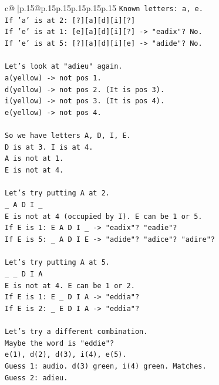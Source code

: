 \documentclass{article}
\begin{document}
{\begin{supertabular}{c@{$\;$}|p{.15\linewidth}@{}p{.15\linewidth}p{.15\linewidth}p{.15\linewidth}p{.15\linewidth}p{.15\linewidth}}
{{{\texttt{Known letters: a, e.} \\
\texttt{If 'a' is at 2: {[}?{]}{[}a{]}{[}d{]}{[}i{]}{[}?{]}} \\
\texttt{If 'e' is at 1: {[}e{]}{[}a{]}{[}d{]}{[}i{]}{[}?{]} {-}> "eadix"? No.} \\
\texttt{If 'e' is at 5: {[}?{]}{[}a{]}{[}d{]}{[}i{]}{[}e{]} {-}> "adide"? No.} \\
\\ 
\texttt{Let's look at "adieu" again.} \\
\texttt{a(yellow) {-}> not pos 1.} \\
\texttt{d(yellow) {-}> not pos 2. (It is pos 3).} \\
\texttt{i(yellow) {-}> not pos 3. (It is pos 4).} \\
\texttt{e(yellow) {-}> not pos 4.} \\
\\ 
\texttt{So we have letters A, D, I, E.} \\
\texttt{D is at 3. I is at 4.} \\
\texttt{A is not at 1.} \\
\texttt{E is not at 4.} \\
\\ 
\texttt{Let's try putting A at 2.} \\
\texttt{\_ A D I \_} \\
\texttt{E is not at 4 (occupied by I). E can be 1 or 5.} \\
\texttt{If E is 1: E A D I \_ {-}> "eadix"? "eadie"?} \\
\texttt{If E is 5: \_ A D I E {-}> "adide"? "adice"? "adire"?} \\
\\ 
\texttt{Let's try putting A at 5.} \\
\texttt{\_ \_ D I A} \\
\texttt{E is not at 4. E can be 1 or 2.} \\
\texttt{If E is 1: E \_ D I A {-}> "eddia"?} \\
\texttt{If E is 2: \_ E D I A {-}> "eddia"?} \\
\\ 
\texttt{Let's try a different combination.} \\
\texttt{Maybe the word is "eddie"?} \\
\texttt{e(1), d(2), d(3), i(4), e(5).} \\
\texttt{Guess 1: audio. d(3) green, i(4) green. Matches.} \\
\texttt{Guess 2: adieu.} \\
}}}
\end{supertabular}}
\end{document}
